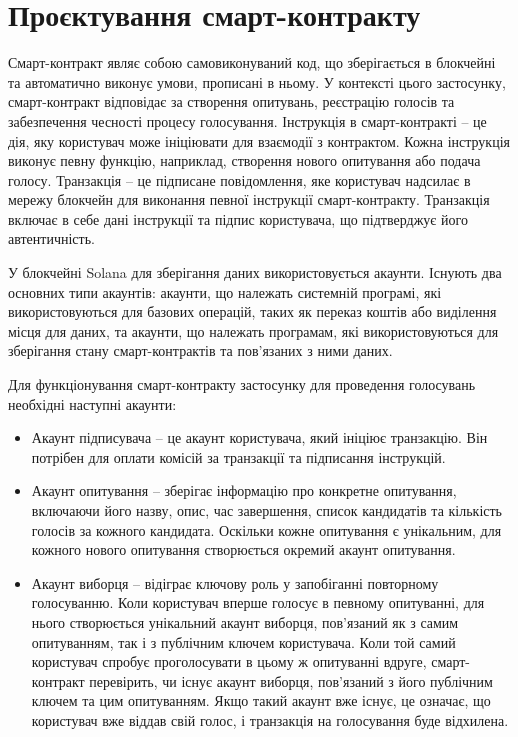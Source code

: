 \documentclass[14pt]{extreport}
\begin{document}
  \section{Проєктування смарт-контракту}
  
  Смарт-контракт являє собою самовиконуваний код, що зберігається в блокчейні та автоматично виконує умови, прописані в ньому. У контексті цього застосунку, смарт-контракт відповідає за створення опитувань, реєстрацію голосів та забезпечення чесності процесу голосування. Інструкція в смарт-контракті – це дія, яку користувач може ініціювати для взаємодії з контрактом. Кожна інструкція виконує певну функцію, наприклад, створення нового опитування або подача голосу. Транзакція – це підписане повідомлення, яке користувач надсилає в мережу блокчейн для виконання певної інструкції смарт-контракту. Транзакція включає в себе дані інструкції та підпис користувача, що підтверджує його автентичність.
  
  У блокчейні Solana для зберігання даних використовується акаунти. Існують два основних типи акаунтів: акаунти, що належать системній програмі, які використовуються для базових операцій, таких як переказ коштів або виділення місця для даних, та акаунти, що належать програмам, які використовуються для зберігання стану смарт-контрактів та пов'язаних з ними даних.
  
  Для функціонування смарт-контракту застосунку для проведення голосувань необхідні наступні акаунти:
  
  \begin{itemize}
    \item Акаунт підписувача – це акаунт користувача, який ініціює транзакцію. Він потрібен для оплати комісій за транзакції та підписання інструкцій.
    \item Акаунт опитування – зберігає інформацію про конкретне опитування, включаючи його назву, опис, час завершення, список кандидатів та кількість голосів за кожного кандидата. Оскільки кожне опитування є унікальним, для кожного нового опитування створюється окремий акаунт опитування.
    \item Акаунт виборця – відіграє ключову роль у запобіганні повторному голосуванню. Коли користувач вперше голосує в певному опитуванні, для нього створюється унікальний акаунт виборця, пов'язаний як з самим опитуванням, так і з публічним ключем користувача. Коли той самий користувач спробує проголосувати в цьому ж опитуванні вдруге, смарт-контракт перевірить, чи існує акаунт виборця, пов'язаний з його публічним ключем та цим опитуванням. Якщо такий акаунт вже існує, це означає, що користувач вже віддав свій голос, і транзакція на голосування буде відхилена.
  \end{itemize}
  
\end{document}
